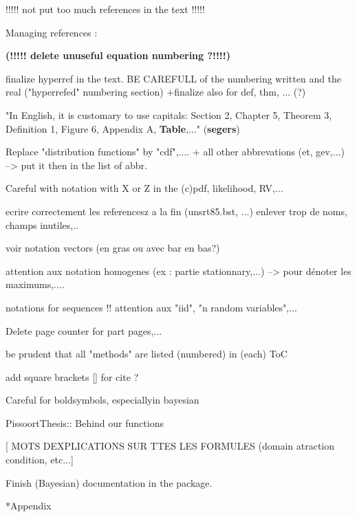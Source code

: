 \documentclass[11pt,a4paper,openany ]{book}
\makeatletter
\renewcommand\part{%
	\if@openright
	\cleardoublepage
	\else
	\clearpage
	\fi
	\thispagestyle{empty}%
	\if@twocolumn
	\onecolumn
	\@tempswatrue
	\else
	\@tempswafalse
	\fi
	\null\vfil
	\secdef\@part\@spart}
\makeatother
\begin{document}
!!!!! not put too much references in the text !!!!!

Managing references : 

\textbf{(!!!!! delete unuseful equation numbering ?!!!!)}

finalize hyperref in the text. BE CAREFULL of the numbering written and the real ("hyperrefed" numbering section)
+finalize also for def, thm, ... (?)

"In English, it is customary to use capitals: Section 2, Chapter 5, Theorem 3, Definition 1, Figure 6, Appendix A, \textbf{Table},..." (\textbf{segers})

Replace "distribution functions" by "cdf",....  + all other abbrevations (et, gev,...) --> put it then in the list of abbr.

Careful with notation with X or Z in the (c)pdf, likelihood, RV,...

ecrire correctement les referencesz a la fin (unsrt85.bst, ...) enlever trop de noms, champs inutiles,..

voir notation vectors (en gras ou avec bar en bas?)

attention aux notation homogenes (ex : partie stationnary,...) --> pour dénoter les 
maximums,....

notations for sequences !! attention aux "iid", "n random variables",... 

Delete page counter for part pages,...

be prudent that all "methods" are listed (numbered) in (each) ToC

add square brackets [] for cite ? 

Careful for boldsymbols, especiallyin bayesian

PissoortThesis:: Behind our functions 

[ MOTS DEXPLICATIONS SUR TTES LES FORMULES (domain atraction condition, etc...]

Finish (Bayesian) documentation in the package.



\part*{Appendix}
\appendix







\setlength{\parindent}{5em}
\setlength{\parskip}{2em}
\renewcommand{\baselinestretch}{4.0}


\end{document}
